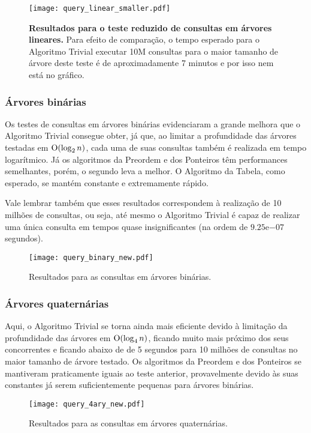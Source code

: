 \begin{figure}[H]
  \texttt{[image: query\_linear\_smaller.pdf]}
  \caption[Resultados para o teste reduzido de consultas em árvores lineares.]
  {\textbf{Resultados para o teste reduzido de consultas em árvores lineares.}
  Para efeito de comparação, o tempo esperado para o Algoritmo Trivial executar 10M
  consultas para o maior tamanho de árvore deste teste é de aproximadamente 7 minutos
  e por isso nem está no gráfico.}
\end{figure}

\subsubsection{Árvores binárias}
Os testes de consultas em árvores binárias evidenciaram a grande melhora que o Algoritmo
Trivial consegue obter, já que, ao limitar a profundidade das árvores testadas em
$\mathrm{O}(\log_2 n)$, cada uma de suas consultas também é realizada em tempo logarítmico.
Já os algoritmos da Preordem e dos Ponteiros têm performances semelhantes, porém, 
o segundo leva a melhor. O Algoritmo da Tabela, como esperado, se mantém constante
e extremamente rápido.

Vale lembrar também que esses resultados correspondem à realização de 10 milhões de
consultas, ou seja, até mesmo o Algoritmo Trivial é capaz de realizar uma única consulta
em tempos quase insignificantes (na ordem de $9.25\mathrm{e}{-07}$ segundos).

\begin{figure}[H]
  \texttt{[image: query\_binary\_new.pdf]}
  \caption{Resultados para as consultas em árvores binárias.}
\end{figure}

\subsubsection{Árvores quaternárias}
Aqui, o Algoritmo Trivial se torna ainda mais eficiente devido à limitação da
profundidade das árvores em $\mathrm{O}(\log_4 n)$, ficando muito mais próximo dos seus
concorrentes e ficando abaixo de de 5 segundos para 10 milhões de consultas no maior
tamanho de árvore testado. Os algoritmos da Preordem e dos Ponteiros se mantiveram
praticamente iguais ao teste anterior, provavelmente devido às suas constantes já serem
suficientemente pequenas para árvores binárias.

\begin{figure}[H]
  \texttt{[image: query\_4ary\_new.pdf]}
  \caption{Resultados para as consultas em árvores quaternárias.}
\end{figure}

